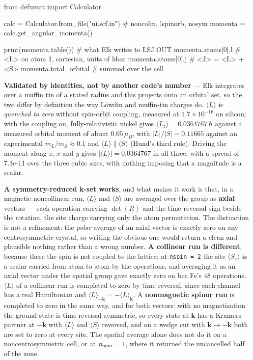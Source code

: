 \documentclass[11pt,a4paper]{article}
\newcommand{\code}[1]{\texttt{\small #1}}
\begin{document}
\begin{pycode}
from defumat import Calculator

calc = Calculator.from_file("ni.scf.in")   # noncolin, lspinorb, nosym
momenta = calc.get_angular_momenta()

print(momenta.table())      # what Elk writes to LSJ.OUT
momenta.atoms[0].l          # <L> on atom 1, cartesian, units of hbar
momenta.atoms[0].j          # <J> = <L> + <S>
momenta.total_orbital       # summed over the cell
\end{pycode}

\textbf{Validated by identities, not by another code's number} --- Elk
integrates over a muffin tin of a stated radius and this projects onto an
orbital set, so the two differ by definition the way Löwdin and muffin-tin
charges do. $\langle L\rangle$ is \emph{quenched to zero} without spin-orbit
coupling, measured at $1.7\times10^{-16}$ on silicon; with the coupling on,
fully-relativistic nickel gives $\langle L_z\rangle = 0.0364767\,\hbar$ against a
measured orbital moment of about $0.05\,\mu_B$, with
$|L|/|S| = 0.11665$ against an experimental $m_L/m_S \approx 0.1$ and $\langle
L\rangle \parallel \langle S\rangle$ (Hund's third rule). Driving the moment
along $z$, $x$ and $y$ gives $|\langle L\rangle| = 0.0364767$ in all three,
with a spread of 7.3e-11 over the three cubic axes, with nothing imposing that a magnitude is a scalar.

\textbf{A symmetry-reduced k-set works}, and what makes it work is that, in
a magnetic noncollinear run, $\langle L\rangle$ and $\langle S\rangle$ are
averaged over the group as \textbf{axial} vectors --- each operation carrying $\det(R)$ and the
time-reversal sign beside the rotation, the site charge carrying only the atom
permutation. The distinction is not a refinement: the \emph{polar} average of an
axial vector is exactly zero on any centrosymmetric crystal, so writing the
obvious one would return a clean and plausible nothing rather than a wrong
number. \textbf{A collinear run is different}, because there the spin is not
coupled to the lattice: at \code{nspin = 2} the site $\langle S_z\rangle$ is a
scalar carried from atom to atom by the operations, and averaging it as an axial
vector under the spatial group gave exactly zero on bcc Fe's 48 operations.
$\langle L\rangle$ of a collinear run is completed to zero by time reversal,
since each channel has a real Hamiltonian and $\langle L\rangle_{-\mathbf k} =
-\langle L\rangle_{\mathbf k}$. A \textbf{nonmagnetic spinor run} is completed to zero in
the same way, and for both vectors: with no magnetization the ground state is
time-reversal symmetric, so every state at $\mathbf k$ has a Kramers partner at
$-\mathbf k$ with $\langle L\rangle$ and $\langle S\rangle$ reversed, and on a
wedge cut with $\mathbf k \to -\mathbf k$ both are set to zero at every site.
The spatial average alone does not do it on a noncentrosymmetric cell, or at
$n_{\rm sym} = 1$, where it returned the uncancelled half of the zone.
\end{document}

